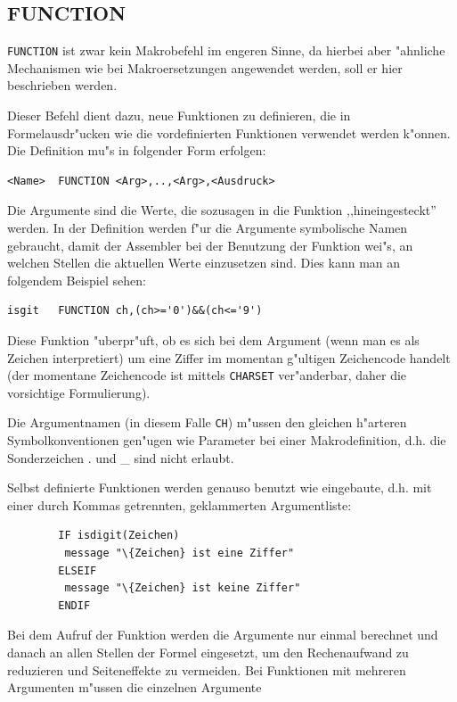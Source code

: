 \documentclass[12pt,a4paper,twoside]{report}
\makeatletter
\newcommand{\tty}[1]{{\tt #1}}
\newcommand{\ttindex}[1]{\index{#1@{\tt #1}}}
\makeatother
\begin{document}

\subsection{FUNCTION}
\ttindex{FUNCTION}
\label{SectFUNCTION}

\tty{FUNCTION} ist zwar kein Makrobefehl im engeren Sinne, da
hierbei aber "ahnliche Mechanismen wie bei Makroersetzungen
angewendet werden, soll er hier beschrieben werden.
\par
Dieser Befehl dient dazu, neue Funktionen zu definieren, die in
Formel\-ausdr"ucken wie die vordefinierten Funktionen verwendet werden
k"onnen.  Die Definition mu"s in folgender Form erfolgen:
\begin{verbatim}
<Name>  FUNCTION <Arg>,..,<Arg>,<Ausdruck>
\end{verbatim}
Die Argumente sind die Werte, die sozusagen in die Funktion
,,hineingesteckt'' werden.  In der Definition werden f"ur die Argumente
symbolische Namen gebraucht, damit der Assembler bei der Benutzung
der Funktion wei"s, an welchen Stellen die aktuellen Werte einzusetzen
sind. Dies kann man an folgendem Beispiel sehen:
\begin{verbatim}
isgit   FUNCTION ch,(ch>='0')&&(ch<='9')
\end{verbatim}
Diese Funktion "uberpr"uft, ob es sich bei dem Argument (wenn man es
als Zeichen interpretiert) um eine Ziffer im momentan g"ultigen
Zeichencode handelt (der momentane Zeichencode ist mittels \tty{CHARSET}
ver"anderbar, daher die vorsichtige Formulierung).
\par
Die Argumentnamen (in diesem Falle \tty{CH}) m"ussen den gleichen h"arteren
Symbolkonventionen gen"ugen wie Parameter bei einer Makrodefinition,
d.h. die Sonderzeichen . und \_ sind nicht erlaubt.
\par
Selbst definierte Funktionen werden genauso benutzt wie eingebaute,
d.h. mit einer durch Kommas getrennten, geklammerten Argumentliste:
\begin{verbatim}
        IF isdigit(Zeichen)
         message "\{Zeichen} ist eine Ziffer"
        ELSEIF
         message "\{Zeichen} ist keine Ziffer"
        ENDIF
\end{verbatim}
\par
Bei dem Aufruf der Funktion werden die Argumente nur einmal berechnet
und danach an allen Stellen der Formel eingesetzt, um den
Rechenaufwand zu reduzieren und Seiteneffekte zu vermeiden.
Bei Funktionen mit mehreren Argumenten m"ussen die einzelnen Argumente
\end{document}
